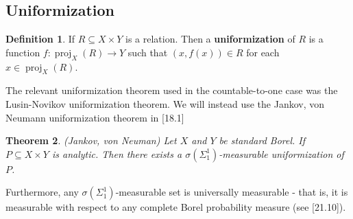\documentclass{article}
\DeclareMathOperator{\proj}{proj}
\newtheorem{theorem}{Theorem}[section]
\theoremstyle{definition}
\newtheorem{definition}[theorem]{Definition}
\begin{document}
\subsection{Uniformization}
\begin{definition}
    If $ R\subseteq X\times Y $ is a relation. Then a \textbf{uniformization} of $ R $ is a function $ f:\proj_X(R) \rightarrow Y $ such that $ (x,f(x))\in R $ for each $ x\in \proj_X(R) $. 
\end{definition}
\noindent The relevant uniformization theorem used in the countable-to-one case was the Lusin-Novikov uniformization theorem. We will instead use the Jankov, von Neumann uniformization theorem in \cite{Kechris95} [18.1]
\begin{theorem}
    \label{JVN} (Jankov, von Neuman) Let $ X $ and $ Y $ be standard Borel. If $ P\subseteq X\times Y $ is analytic. Then there exists a $ \sigma(\Sigma^1_1) $-measurable uniformization of $ P $.
\end{theorem}
\noindent Furthermore, any $ \sigma(\Sigma^1_1) $-measurable set is universally measurable - that is, it is measurable with respect to any complete Borel probability measure (see \cite{Kechris95} [21.10]).
\end{document}
